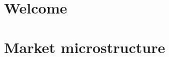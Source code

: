 \documentclass{unito26slides}
\begin{document}
\inserttitleframe
\inserttableofcontents

\section{Welcome}






\section{Market microstructure}








\end{document}
